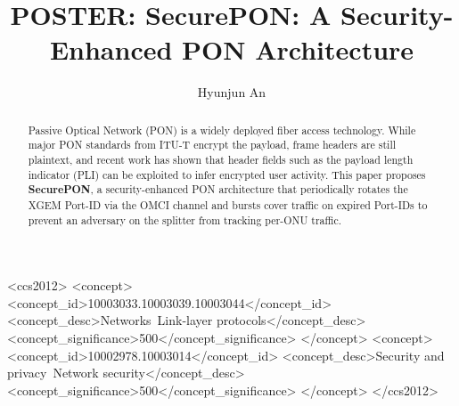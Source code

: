 \documentclass[sigconf]{acmart}
\begin{document}
\title{POSTER: SecurePON: A Security-Enhanced PON Architecture}

\author{Hyunjun An}
\renewcommand{\shortauthors}{Hyunjun An}

\begin{abstract}
 Passive Optical Network (PON) is a widely deployed fiber access technology. While major PON standards from ITU-T encrypt the payload, frame headers are still plaintext, and recent work has shown that header fields such as the payload length indicator (PLI) can be exploited to infer encrypted user activity. This paper proposes \textbf{SecurePON},  a security-enhanced PON architecture that periodically rotates the XGEM Port-ID via the OMCI channel and bursts cover traffic on expired Port-IDs to prevent an adversary on the splitter from tracking per-ONU traffic.
\end{abstract}


\begin{CCSXML}
<ccs2012>
   <concept>
       <concept_id>10003033.10003039.10003044</concept_id>
       <concept_desc>Networks~Link-layer protocols</concept_desc>
       <concept_significance>500</concept_significance>
       </concept>
   <concept>
       <concept_id>10002978.10003014</concept_id>
       <concept_desc>Security and privacy~Network security</concept_desc>
       <concept_significance>500</concept_significance>
       </concept>
 </ccs2012>
\end{CCSXML}

%
\end{document}
